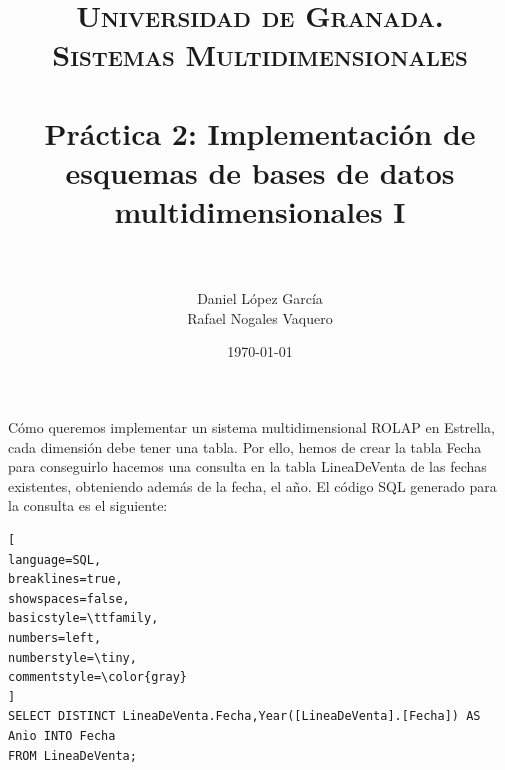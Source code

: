 \documentclass[paper=a4, fontsize=11pt, spanish]{scrartcl}
\title{
  \normalfont \normalsize 
  \textsc{Universidad de Granada.\\Sistemas Multidimensionales} \\ [25pt] %
  \horrule{0.5pt} \\[0.4cm] %
  \huge Práctica 2: Implementación de esquemas de bases de datos multidimensionales I \\ %
  \horrule{2pt} \\[0.5cm] %
}
\author{Daniel López García\\Rafael Nogales Vaquero} %
\date{\normalsize\today} %
\numberwithin{equation}{section} %
\numberwithin{figure}{section} %
\numberwithin{table}{section} %
\begin{document}
\maketitle %
Cómo queremos implementar un sistema multidimensional ROLAP en Estrella, cada dimensión debe tener una tabla. Por ello, hemos de crear la tabla Fecha para conseguirlo hacemos una consulta en la tabla LineaDeVenta de las fechas existentes, obteniendo además de la fecha, el año. 
\newline El código SQL generado para la consulta es el siguiente:
\begin{lstlisting}[
language=SQL,
breaklines=true,
showspaces=false,
basicstyle=\ttfamily,
numbers=left,
numberstyle=\tiny,
commentstyle=\color{gray}
]
SELECT DISTINCT LineaDeVenta.Fecha,Year([LineaDeVenta].[Fecha]) AS Anio INTO Fecha 
FROM LineaDeVenta;
\end{lstlisting}
\end{document}
